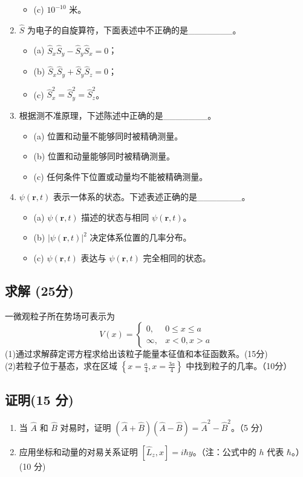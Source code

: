 \begin{enumerate}
\begin{itemize}
    \item (c) $10^{-10}$ 米。
\end{itemize}
    \item $\hat{S}$ 为电子的自旋算符，下面表述中不正确的是_______。  
    \begin{itemize}
    \item (a) $\hat{S}_x \hat{S}_y - \hat{S}_y \hat{S}_x = 0$；
    \item (b) $\hat{S}_x \hat{S}_y + \hat{S}_y \hat{S}_z = 0$；
    \item (c) $\hat{S}_x^2 = \hat{S}_y^2 = \hat{S}_z^2$。
\end{itemize}
    \item 根据测不准原理，下述陈述中正确的是_______。 
    \begin{itemize}
    \item (a) 位置和动量不能够同时被精确测量。
    \item (b) 位置和动量能够同时被精确测量。
    \item (c) 任何条件下位置或动量均不能被精确测量。
\end{itemize}
    \item $\psi(\mathbf{r}, t)$ 表示一体系的状态。下述表述正确的是_______。
    \begin{itemize}
    \item (a) $\psi(\mathbf{r}, t)$ 描述的状态与相同 $\psi(\mathbf{r}, t)$。
    \item (b) $|\psi(\mathbf{r}, t)|^2$ 决定体系位置的几率分布。
    \item (c) $\psi(\mathbf{r}, t)$ 表达与 $\psi(\mathbf{r}, t)$ 完全相同的状态。
\end{itemize}
\end{enumerate}
\subsection{求解 (25分)}
一微观粒子所在势场可表示为
\[
V(x) = 
\begin{cases} 
0, & 0 \leq x \leq a \\
\infty, & x < 0 , x > a
\end{cases}~
\]
(1)通过求解薛定谔方程求给出该粒子能量本征值和本征函数系。(15分)\\
(2)若粒子位于基态，求在区域 $\left\{x = \frac{a}{4}, x = \frac{3a}{4}\right\}$ 中找到粒子的几率。（10分）
\subsection{证明(15 分)}
\begin{enumerate}
    \item 当 $\hat{A}$ 和 $\hat{B}$ 对易时，证明 $ (\hat{A} + \hat{B})(\hat{A} - \hat{B}) = \hat{A}^2 - \hat{B}^2$。（5 分）
    
    \item 应用坐标和动量的对易关系证明 $[\hat{L}_z, x] = i \hbar y$。（注：公式中的 $h$ 代表 $\hbar$。）(10 分)
\end{enumerate}
